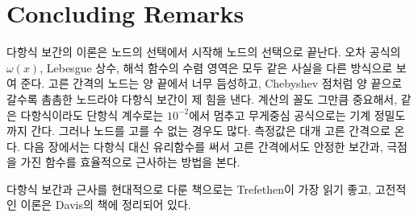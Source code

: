 \section{Concluding Remarks}

다항식 보간의 이론은 노드의 선택에서 시작해 노드의 선택으로 끝난다. 오차 공식의 $\omega(x)$, Lebesgue 상수, 해석 함수의 수렴 영역은 모두 같은 사실을 다른 방식으로 보여 준다. 고른 간격의 노드는 양 끝에서 너무 듬성하고, Chebyshev 점처럼 양 끝으로 갈수록 촘촘한 노드라야 다항식 보간이 제 힘을 낸다. 계산의 꼴도 그만큼 중요해서, 같은 다항식이라도 단항식 계수로는 $10^{-2}$에서 멈추고 무게중심 공식으로는 기계 정밀도까지 간다. 그러나 노드를 고를 수 없는 경우도 많다. 측정값은 대개 고른 간격으로 온다. 다음 장에서는 다항식 대신 유리함수를 써서 고른 간격에서도 안정한 보간과, 극점을 가진 함수를 효율적으로 근사하는 방법을 본다.

다항식 보간과 근사를 현대적으로 다룬 책으로는 Trefethen\cite{trefethen2019atap}이 가장 읽기 좋고, 고전적인 이론은 Davis의 책\cite{davis1975interpolation}에 정리되어 있다.

\chapterreferences
